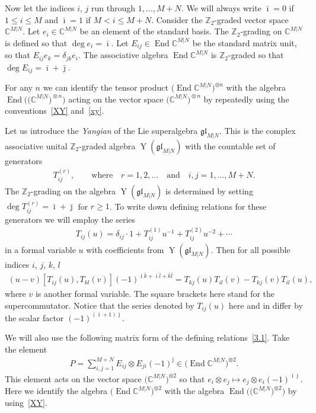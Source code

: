 \documentclass[10pt,a4paper]{amsart}
\numberwithin{equation}{section}
\def\bi{{\bar\imath }}
\def\bj{{\bar\jmath }}
\def\bk{{\bar k }}
\def\bl{{\bar l }}
\def\CC{{\mathbb{C}}}
\def\CMN{\CC^{M|N}}
\def\de{\delta}
\def\End{\operatorname{End}}
\def\ge{\geqslant}
\def\glMN{\mathfrak{gl}_{M|N}}
\def\le{\leqslant}
\def\ot{\otimes}
\def\YMN{\operatorname{Y}(\glMN)}
\def\ZZ{\mathbb{Z}}
\begin{document}
Now let the indices $i$, $j$ run through $1,\dots, M+N $.
We will always write $\bi=0$ if $1\le i\le M$ and
$\bi=1$ if $M<i\le M+N $. Consider the
$\ZZ_{2}$-graded vector space $\CMN $.
Let $e_i\in\CMN$ be an element of the standard basis.
The $\ZZ_{2}$-grading on $\CMN$ is defined so that $\deg e_i=\bi $.
Let $E_{ij}\in\End\CMN$ be the standard matrix unit, so that
$E_{ij} e_k=\de_{jk} e_i $. The
associative algebra $\End\CMN$
is $\ZZ_{2}$-graded so that $\deg E_{ij}=\bi+ \bj $.

For any $n$ we can identify
the tensor product $\big(\!\End\CMN\big)^{\ot n}$ with the algebra
$\End\!\big(\big(\CMN\big)^{\!\ot n}\big)$ acting on the vector space $\big(\CMN\big)^{\!\ot n}$
by repeatedly using the conventions~\eqref{XY} and~\eqref{xy}.

Let us introduce the {\it Yangian} of the Lie superalgebra
$\glMN$. This is the complex associative
unital $\ZZ_{2}$-graded algebra $\YMN$ with the countable set of generators
\begin{gather}\label{Tijr}
T^{(r)}_{ij},
\qquad\text{where}\quad r=1,2, \dots \quad\text{and}\quad i ,j=1,\dots, M+N .
\end{gather}
The $\ZZ_{2}$-grading on the algebra $\YMN$
is determined by setting $\deg T_{ij}^{(r)}=\bi+\bj$ for $r\ge1$.
To write down defining relations for these
generators we will employ the series
\begin{gather}\label{3.0}
T_{ij}(u)=\de_{ij}\cdot1+T_{ij}^{(1)} u^{-1}+T_{ij}^{(2)} u^{-2}+\cdots
\end{gather}
in a formal variable $u$ with coefficients from $\YMN $.
Then for all possible indices $i$, $j$, $k$, $l${\samepage
\begin{gather}\label{3.1}
(u-v)[ T_{ij}(u) ,T_{kl}(v) ](-1)^{\bi \bk + \bi \bl + \bk \bl}=T_{kj}(u) T_{il}(v)-T_{kj}(v) T_{il}(u),
\end{gather}
where $v$ is another formal variable.
The square brackets here stand for the supercommutator.
Notice that the series denoted by $T_{ij}(u)$
here and in \cite{N1} differ by the scalar factor
$(-1)^{( \bi+1 ) \bj}$.}

We will also use the following matrix form of the defining relations~\eqref{3.1}.
Take the element
\begin{gather}\label{pop}
P = \sum_{i,j=1}^{M+N} E_{ij}\ot E_{ji} (-1)^{\bj}
\in\big(\End\CMN\big)^{\ot 2} .
\end{gather}
This element acts on the vector space $\big(\CMN\big)^{\ot 2}$ so that
$e_i\ot e_{j}\mapsto e_j\ot e_i {(-1)}^{\bi \bj}$.
Here we identify the algebra $\big(\End\CMN\big)^{\ot 2}$ with the algebra
$\End\big(\big(\CMN\big)^{\ot 2}\big)$ by using~\eqref{XY}.
\end{document}
